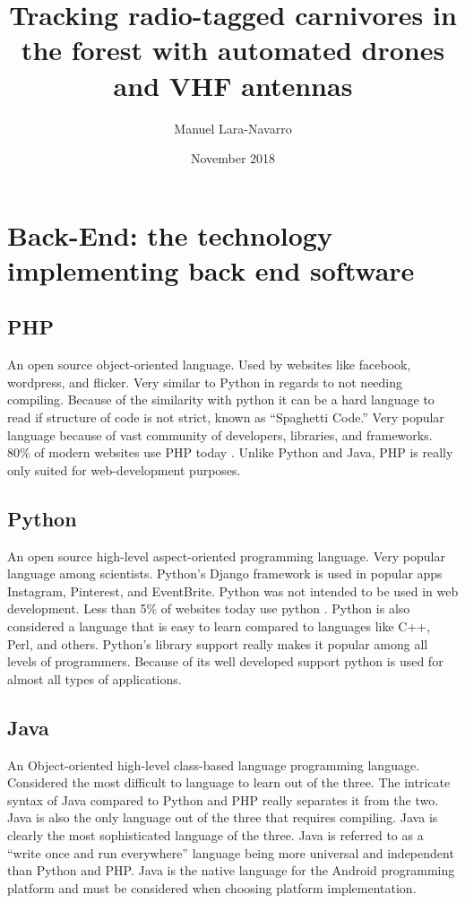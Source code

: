 \documentclass[onecolumn, draftclsnofoot,10pt, compsoc]{IEEEtran}
\title{Tracking radio-tagged carnivores in the forest with automated drones and VHF antennas}
\author{Manuel Lara-Navarro}
\date{November 2018}
\begin{document}
\maketitle
\newpage


\section{Back-End: the technology implementing back end software}

    \subsection{PHP}
    An open source object-oriented language. Used by websites like facebook, wordpress, and flicker. Very similar to Python in regards to not needing compiling. Because of the similarity with
    python it can be a hard language to read if structure of code is not strict, known as “Spaghetti Code.” Very popular language because of vast community of developers, libraries, and
    frameworks. 80\% of modern websites use PHP today  \cite{ProgrammingLanguages}. Unlike Python and Java, PHP is really only suited for web-development purposes.

    \subsection{Python}
    An open source high-level aspect-oriented programming language. Very popular language among scientists. Python’s Django framework is used in popular apps Instagram, Pinterest, and
    EventBrite. Python was not intended to be used in web development. Less than 5\% of websites today use python \cite{ProgrammingLanguages}. Python is also considered a language that is easy to learn compared to
    languages like C++, Perl, and others. Python’s library support really makes it popular among all levels of programmers. Because of its well developed support python is used for almost all
    types of applications.

    \subsection{Java}
    An Object-oriented high-level class-based language programming language. Considered the most difficult to language to learn out of the three. The intricate syntax of Java compared to Python and PHP really separates it from the two. Java is also the only language out of the three that requires compiling. Java is clearly the most sophisticated language of the three. Java is referred to as a “write once and run everywhere” language being more universal and independent than Python and PHP. Java is the native language for the Android programming platform and must be considered when choosing platform implementation.
    \newline
\end{document}
